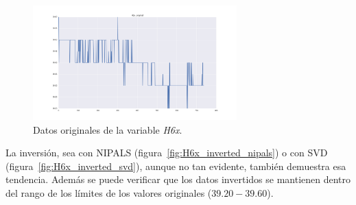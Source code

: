 \documentclass[11pt,spanish,listoffigures,listoftables]{tfgetsinf}
\begin{document}
    \begin{figure}[h]
        \centering
        \includegraphics[width=0.7\textwidth]{H6x_original.png}
        \caption{Datos originales de la variable {\em H6x}.}
        \label{fig:H6x_original}
    \end{figure}    
    
    La inversión, sea con NIPALS (figura~\ref{fig:H6x_inverted_nipals}) o con SVD (figura~\ref{fig:H6x_inverted_svd}), aunque no tan evidente, también demuestra esa tendencia. Además se puede verificar que los datos invertidos se mantienen dentro del rango de los límites de los valores originales (\(39.20-39.60\)).
\end{document}
